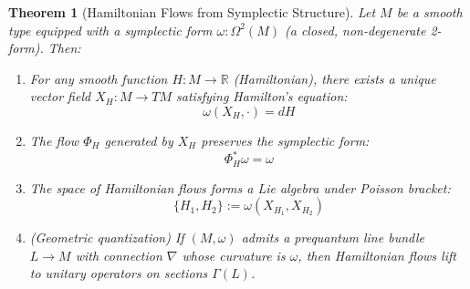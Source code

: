 \documentclass[11pt]{article}
\newtheorem{theorem}{Theorem}[section]
\theoremstyle{definition}
\begin{document}
\begin{theorem}[Hamiltonian Flows from Symplectic Structure]
\label{thm:hamiltonian}
Let $M$ be a smooth type equipped with a symplectic form $\omega : \Omega^2(M)$ (a closed, non-degenerate 2-form). Then:

\begin{enumerate}
\item For any smooth function $H : M \to \mathbb{R}$ (Hamiltonian), there exists a unique vector field $X_H : M \to TM$ satisfying Hamilton's equation:
\[
\omega(X_H, \cdot) = dH
\]

\item The flow $\Phi_H$ generated by $X_H$ preserves the symplectic form:
\[
\Phi_H^* \omega = \omega
\]

\item The space of Hamiltonian flows forms a Lie algebra under Poisson bracket:
\[
\{H_1, H_2\} := \omega(X_{H_1}, X_{H_2})
\]

\item (Geometric quantization) If $(M, \omega)$ admits a prequantum line bundle $L \to M$ with connection $\nabla$ whose curvature is $\omega$, then Hamiltonian flows lift to unitary operators on sections $\Gamma(L)$.
\end{enumerate}
\end{theorem}
\end{document}
